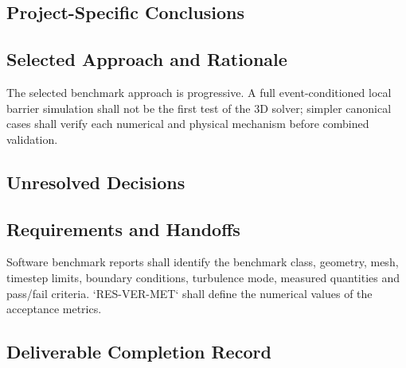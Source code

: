 
\subsection{Project-Specific Conclusions}
\label{sec:res-ver-bmk-conclusions}


\subsection{Selected Approach and Rationale}
\label{sec:res-ver-bmk-selected-approach}


The selected benchmark approach is progressive. A full
event-conditioned local barrier simulation shall not be the first test
of the 3D solver; simpler canonical cases shall verify each numerical
and physical mechanism before combined validation.

\subsection{Unresolved Decisions}
\label{sec:res-ver-bmk-unresolved-decisions}


\subsection{Requirements and Handoffs}
\label{sec:res-ver-bmk-requirements}


Software benchmark reports shall identify the benchmark class,
geometry, mesh, timestep limits, boundary conditions, turbulence mode,
measured quantities and pass/fail criteria. `RES-VER-MET` shall define
the numerical values of the acceptance metrics.

\subsection{Deliverable Completion Record}
\label{sec:res-ver-bmk-completion-record}

%
%
%
